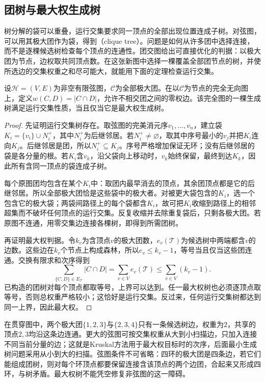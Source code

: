 \subsection{团树与最大权生成树}
\label{sec:graph-theory-clique-trees}

树分解的袋可以重叠，运行交集要求同一顶点的全部出现位置连成子树。对弦图，可以用其极大团作为袋，得到（clique tree）。问题是如何从许多团中选择连接，而不是逐棵候选树检查每个顶点的连通性。团交图给出可直接优化的判据：以极大团为节点，边权取共同顶点数。在这张新图中选择一棵覆盖全部团节点的树，并使所选边的交集权重之和尽可能大，就能用下面的定理检查运行交集。
\begin{theorem}[最大权生成树与团树]
  \label{thm:graph-theory-clique-tree-maximum-weight}
  设\(\mathcal H=(V,E)\)为非空有限弦图，\(\mathcal C\)为全部极大团。在以\(\mathcal C\)为节点的完全无向图上，定义\(w(C,D)=|C\cap D|\)，允许不相交团之间的零权边。该完全图的一棵生成树满足运行交集性质，当且仅当它是最大权生成树。
\end{theorem}
\begin{proof}
先证明运行交集树存在。取弦图的完美消元序\(v_1,\ldots,v_n\)，建立袋\(K_i=\{v_i\}\cup N_i^+\)，其中\(N_i^+\)为后继邻居。若\(N_i^+\neq\varnothing\)，取其中序号最小的\(v_j\)并把\(K_i\)连向\(K_j\)。后继邻居是团，所以\(N_i^+\subseteq K_j\)。序号严格增加保证无环；没有后继邻居的袋是各分量的根。若\(K_i\)含\(v_k\)，沿父袋向上移动时，\(v_k\)始终保留，最终到达\(K_k\)，因此所有含同一顶点的袋连成子树。

每个原图团均包含在某个\(K_i\)中：取团内最早消去的顶点，其余团顶点都是它的后继邻居。所以全部极大团恰是这些袋中的极大者。对被更大袋包含的\(K_i\)，选一个包含它的极大袋；两袋间路径上的每个袋都含\(K_i\)，故可把\(K_i\)收缩到路径上的相邻超集而不破坏任何顶点的运行交集。反复收缩并去除重复袋后，只剩各极大团。若原图不连通，用零交集边连接各棵树，即得到所需团树。

再证明最大权判据。令\(k_v\)为含顶点\(v\)的极大团数，\(e_v(\mathcal T)\)为候选树中两端都含\(v\)的边数。这些边在\(k_v\)个节点上构成森林，所以\(e_v\leq k_v-1\)，等号当且仅当这些团连通。交换有限求和次序得到
\[
  \sum_{\{C,D\}\in E_{\mathcal T}}|C\cap D|
  =\sum_{v\in V}e_v(\mathcal T)
  \leq\sum_{v\in V}(k_v-1).
\]
已构造的团树对每个顶点都取等号，上界可以达到。任一最大权树也必须逐顶点取等号，否则总权重严格较小；这恰好是运行交集。反过来，任何运行交集树都达到同一上界，因此最大权。
\end{proof}
在贯穿图中，两个极大团\(\{1,2,3\}\)与\(\{2,3,4\}\)只有一条候选树边，权重为\(2\)，共享的顶点\(2,3\)均沿这条边连通。更大的弦图可按交集权重从大到小扫描边，只加入连接不同当前分量的边；这就是Kruskal方法用于最大权目标时的次序，后面最小生成树问题采用从小到大的扫描。弦图条件不可省略：四环的极大团是四条边，若它们能组成团树，则对每个环顶点都要保留连接含该顶点的两个边团，合起来又形成四环，与树矛盾。最大权树不能凭空修复非弦图的这一障碍。

